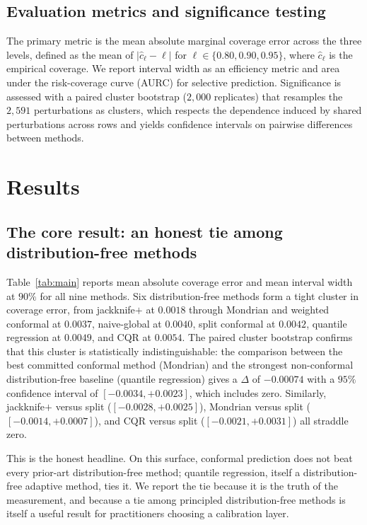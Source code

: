 \documentclass{article}
\begin{document}
\subsection{Evaluation metrics and significance testing}

The primary metric is the mean absolute marginal coverage error across
the three levels, defined as the mean of $\lvert \hat{c}_\ell -
\ell\rvert$ for $\ell \in \{0.80, 0.90, 0.95\}$, where $\hat{c}_\ell$ is
the empirical coverage. We report interval width as an efficiency metric
and area under the risk-coverage curve (AURC) for selective prediction.
Significance is assessed with a paired cluster bootstrap ($2{,}000$
replicates) that resamples the $2{,}591$ perturbations as clusters, which
respects the dependence induced by shared perturbations across rows and
yields confidence intervals on pairwise differences between methods.

\section{Results}

\subsection{The core result: an honest tie among distribution-free methods}

Table~\ref{tab:main} reports mean absolute coverage error and mean
interval width at $90\%$ for all nine methods. Six distribution-free
methods form a tight cluster in coverage error, from jackknife$+$ at
$0.0018$ through Mondrian and weighted conformal at $0.0037$,
naive-global at $0.0040$, split conformal at $0.0042$, quantile
regression at $0.0049$, and CQR at $0.0054$. The paired cluster bootstrap
confirms that this cluster is statistically indistinguishable: the
comparison between the best committed conformal method (Mondrian) and the
strongest non-conformal distribution-free baseline (quantile regression)
gives a $\Delta$ of $-0.00074$ with a $95\%$ confidence interval of
$[-0.0034, +0.0023]$, which includes zero. Similarly, jackknife$+$ versus
split ($[-0.0028, +0.0025]$), Mondrian versus split
($[-0.0014, +0.0007]$), and CQR versus split ($[-0.0021, +0.0031]$) all
straddle zero.

This is the honest headline. On this surface, conformal prediction does
not beat every prior-art distribution-free method; quantile regression,
itself a distribution-free adaptive method, ties it. We report the tie
because it is the truth of the measurement, and because a tie among
principled distribution-free methods is itself a useful result for
practitioners choosing a calibration layer.
\end{document}

